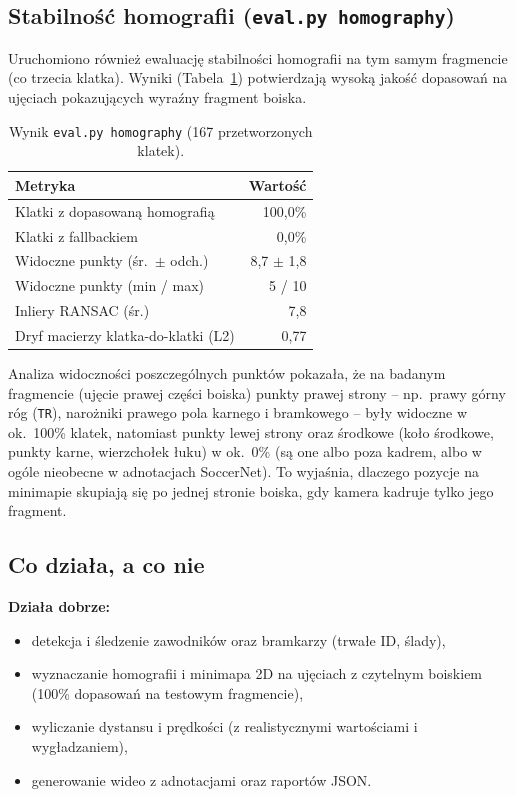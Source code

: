 \documentclass[11pt,a4paper]{article}
\begin{document}
\subsection{Stabilność homografii (\texttt{eval.py homography})}

Uruchomiono również ewaluację stabilności homografii na tym samym fragmencie
(co trzecia klatka). Wyniki (Tabela~\ref{tab:homo}) potwierdzają wysoką jakość
dopasowań na ujęciach pokazujących wyraźny fragment boiska.

\begin{table}[H]
\centering
\small
\caption{Wynik \texttt{eval.py homography} (167 przetworzonych klatek).}
\label{tab:homo}
\begin{tabular}{l r}
\toprule
Metryka & Wartość \\
\midrule
Klatki z dopasowaną homografią & 100,0\% \\
Klatki z fallbackiem           & 0,0\% \\
Widoczne punkty (śr.\ $\pm$ odch.) & 8,7 $\pm$ 1,8 \\
Widoczne punkty (min / max)    & 5 / 10 \\
Inliery RANSAC (śr.)           & 7,8 \\
Dryf macierzy klatka-do-klatki (L2) & 0,77 \\
\bottomrule
\end{tabular}
\end{table}

Analiza widoczności poszczególnych punktów pokazała, że na badanym fragmencie
(ujęcie prawej części boiska) punkty prawej strony -- np.\ prawy górny róg
(\texttt{TR}), narożniki prawego pola karnego i bramkowego -- były widoczne w
ok.~100\% klatek, natomiast punkty lewej strony oraz środkowe (koło środkowe,
punkty karne, wierzchołek łuku) w ok.~0\% (są one albo poza kadrem, albo w
ogóle nieobecne w adnotacjach SoccerNet). To wyjaśnia, dlaczego pozycje na
minimapie skupiają się po jednej stronie boiska, gdy kamera kadruje tylko jego
fragment.

\subsection{Co działa, a co nie}

\textbf{Działa dobrze:}
\begin{itemize}[nosep]
  \item detekcja i śledzenie zawodników oraz bramkarzy (trwałe ID, ślady),
  \item wyznaczanie homografii i minimapa 2D na ujęciach z czytelnym boiskiem
        (100\% dopasowań na testowym fragmencie),
  \item wyliczanie dystansu i prędkości (z realistycznymi wartościami i
        wygładzaniem),
  \item generowanie wideo z adnotacjami oraz raportów JSON.
\end{itemize}
\end{document}
